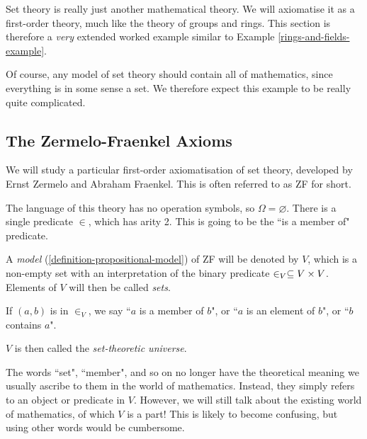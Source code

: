 \documentclass{article}
\begin{document}
Set theory is really just another mathematical theory. We will axiomatise it as a first-order theory, much like the theory of groups and rings. This section is therefore a \textit{very} extended worked example similar to Example \ref{rings-and-fields-example}.

\begin{note}
	Of course, any model of set theory should contain all of mathematics, since everything is in some sense a set. We therefore expect this example to be really quite complicated.
\end{note}


\subsection{The Zermelo-Fraenkel Axioms}
\label{section-set-theory-zf}

We will study a particular first-order axiomatisation of set theory, developed by Ernst Zermelo and Abraham Fraenkel. This is often referred to as ZF for short.

The language of this theory has no operation symbols, so $\Omega = \varnothing$. There is a single predicate $\in$, which has arity 2. This is going to be the ``is a member of" predicate.

\begin{definition}
    A \textit{model} (\ref{definition-propositional-model}) of ZF will be denoted by $V$, which is a non-empty set with an interpretation of the binary predicate $\in_V \subseteq V \times V$. Elements of $V$ will then be called \textit{sets}.

	If $(a, b)$ is in $\in_V$, we say ``$a$ is a member of $b$", or ``$a$ is an element of $b$", or ``$b$ contains $a$".
	
	$V$ is then called the \textit{set-theoretic universe}.
\end{definition}

\begin{note}
	The words ``set", ``member", and so on no longer have the theoretical meaning we usually ascribe to them in the world of mathematics. Instead, they simply refers to an object or predicate in $V$. However, we will still talk about the existing world of mathematics, of which $V$ is a part! This is likely to become confusing, but using other words would be cumbersome.
\end{note}
\end{document}

